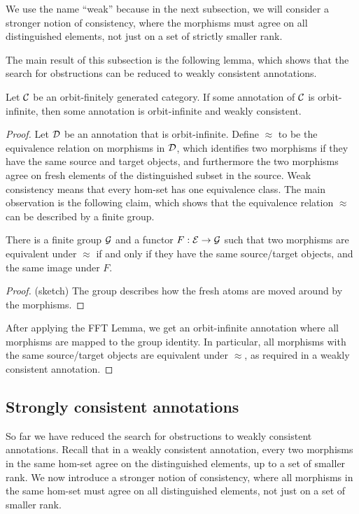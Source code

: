 We use the name ``weak'' because in the  next subsection, we  will consider a stronger notion of consistency, where the morphisms must agree on all distinguished elements, not just on a set of strictly smaller rank. 

The main result of this subsection is the following lemma, which shows that the search for obstructions can be reduced to weakly consistent annotations.
\begin{lemma}\label{lem:complete-annotation-exists-weakly-consistent}
    Let ${\mathcal C}$ be an orbit-finitely generated category.
    If some  annotation of ${\mathcal C}$ is orbit-infinite, then some  annotation is orbit-infinite and weakly consistent.
\end{lemma}

\begin{proof}
    Let ${\mathcal D}$ be an annotation that is orbit-infinite. Define $\approx$ to be the equivalence relation on morphisms in ${\mathcal D}$, which identifies two morphisms if they have the same 
    source and target objects,  and  furthermore the two morphisms agree on fresh elements of the distinguished subset in the source. Weak consistency means that every hom-set has one equivalence class.  The main observation is the following claim, which shows that the equivalence relation $\approx$ can be described by a finite group. 

    \begin{claim}\label{claim:equivalence-relation-finite-group}
        There is a finite group ${\mathcal G}$ and a functor $F : {\mathcal E} \to {\mathcal G}$
        such that two morphisms are equivalent under $\approx$ if and only if they have the same source/target objects, and the same image under $F$.
    \end{claim}
    \begin{proof}
        (sketch) The group describes how the fresh atoms are moved around by the morphisms.
    \end{proof}

    After applying the FFT Lemma, we get an orbit-infinite annotation where all morphisms are mapped to the group identity. In particular, all morphisms with the same source/target objects are equivalent under $\approx$, as required in a weakly consistent annotation.
\end{proof}

\subsection{Strongly consistent annotations}
\label{sec:strongly-consistent-annotations}
So far we have reduced the search for obstructions to weakly consistent annotations. Recall that in a weakly consistent annotation, every two morphisms in the same hom-set agree on the distinguished elements, up to a set of smaller rank. We now introduce a stronger notion of consistency, where all morphisms in the same hom-set must agree on all distinguished elements, not just on a set of smaller rank. 


